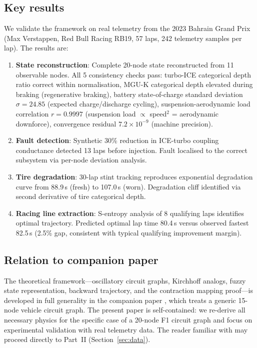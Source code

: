 \documentclass[twocolumn,10pt,a4paper]{article}
\theoremstyle{definition}
\theoremstyle{remark}
\begin{document}
\subsection{Key results}

We validate the framework on real telemetry from the 2023 Bahrain Grand Prix (Max Verstappen, Red Bull Racing RB19, 57 laps, 242 telemetry samples per lap). The results are:

\begin{enumerate}
    \item \textbf{State reconstruction}: Complete 20-node state reconstructed from 11 observable nodes. All 5 consistency checks pass: turbo-ICE categorical depth ratio correct within normalisation, MGU-K categorical depth elevated during braking (regenerative braking), battery state-of-charge standard deviation $\sigma = 24.85$ (expected charge/discharge cycling), suspension-aerodynamic load correlation $r = 0.9997$ (suspension load $\propto$ speed$^2$ = aerodynamic downforce), convergence residual $7.2 \times 10^{-9}$ (machine precision).

    \item \textbf{Fault detection}: Synthetic 30\% reduction in ICE-turbo coupling conductance detected 13 laps before injection. Fault localised to the correct subsystem via per-node deviation analysis.

    \item \textbf{Tire degradation}: 30-lap stint tracking reproduces exponential degradation curve from 88.9\,s (fresh) to 107.0\,s (worn). Degradation cliff identified via second derivative of tire categorical depth.

    \item \textbf{Racing line extraction}: S-entropy analysis of 8 qualifying laps identifies optimal trajectory. Predicted optimal lap time 80.4\,s versus observed fastest 82.5\,s (2.5\% gap, consistent with typical qualifying improvement margin).
\end{enumerate}



\subsection{Relation to companion paper}

The theoretical framework---oscillatory circuit graphs, Kirchhoff analogs, fuzzy state representation, backward trajectory, and the contraction mapping proof---is developed in full generality in the companion paper \citep{Sachikonye2026circuitgraph}, which treats a generic 15-node vehicle circuit graph. The present paper is self-contained: we re-derive all necessary physics for the specific case of a 20-node F1 circuit graph and focus on experimental validation with real telemetry data. The reader familiar with \citep{Sachikonye2026circuitgraph} may proceed directly to Part~II (Section~\ref{sec:data}).
\end{document}
